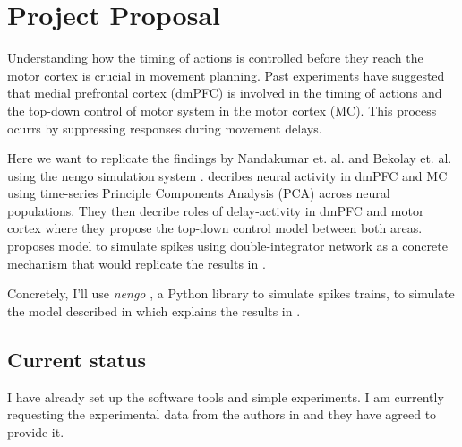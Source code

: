 \documentclass[a4paper]{article}
\begin{document}
\section*{Project Proposal}


Understanding how the timing of actions is controlled before
they reach the motor cortex is crucial in movement planning.
Past experiments have suggested that medial prefrontal cortex (dmPFC)
is involved in the timing of actions and the top-down control of motor system
in the motor cortex (MC). This process ocurrs by suppressing responses
during movement delays.

Here we want to replicate the findings by Nandakumar et. al. \cite{narayanan2009delay}
and Bekolay et. al. \cite{bekolay2014spiking} using the nengo simulation system \cite{bekolay2013nengo}.
\cite{narayanan2009delay} decribes neural activity in dmPFC and MC using
time-series Principle Components Analysis (PCA) across neural populations.
They then decribe roles of delay-activity in dmPFC and motor cortex where
they propose the top-down control model between both areas. \cite{bekolay2014spiking}
proposes model to simulate spikes using double-integrator network as a concrete
mechanism that would replicate the results in \cite{narayanan2009delay}.

Concretely, I'll use \textit{nengo} \cite{bekolay2013nengo}, a Python library to simulate spikes trains,
to simulate the model described in \cite{bekolay2014spiking} which
explains the results in \cite{narayanan2009delay}.

\subsection*{Current status}

I have already set up the software tools and simple experiments.
I am currently requesting the experimental data from the authors in
\cite{narayanan2009delay} and they have agreed to provide it.


{}

\end{document}
